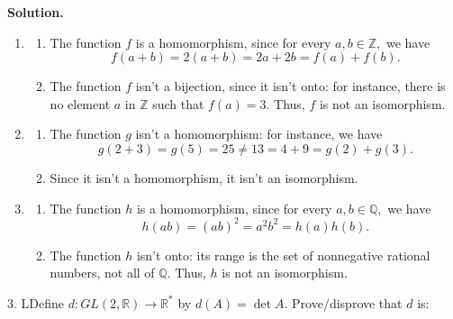 \documentclass[10pt,]{book}
\theoremstyle{plain}
\theoremstyle{definition}
\theoremstyle{definition}
\theoremstyle{definition}
\theoremstyle{definition}
\numberwithin{equation}{section}
\def\Z{\mathbb{Z}}
\def\R{\mathbb{R}}
\def\Q{\mathbb{Q}}
\begin{document}
\begin{exerciselist}
\begin{enumerate}[label=(\alph*)]
\end{enumerate}
%
\par\smallskip
\par\smallskip
\noindent\textbf{Solution.}\hypertarget{solution-22}{}\quad
\leavevmode%
\begin{enumerate}[label=(\alph*)]
\item\hypertarget{li-169}{}%
\begin{enumerate}[label=\roman*.]
\item\hypertarget{li-170}{}The function \(f\) is a homomorphism, since for every \(a,b \in
\Z,\) we have%
\begin{equation*}
f(a+b)=2(a+b)=2a+2b=f(a)+f(b).
\end{equation*}
%
\item\hypertarget{li-171}{}The function \(f\) isn't a bijection, since it isn't onto: for instance, there is no element \(a\) in \(\Z\) such that \(f(a)=3\). Thus, \(f\) is not an isomorphism.%
\end{enumerate}
%
\item\hypertarget{li-172}{}%
\begin{enumerate}[label=\roman*.]
\item\hypertarget{li-173}{}The function \(g\) isn't a homomorphism: for instance, we have%
\begin{equation*}
g(2+3)=g(5)=25\neq 13=4+9=g(2)+g(3).
\end{equation*}
%
\item\hypertarget{li-174}{}Since it isn't a homomorphism, it isn't an isomorphism.%
\end{enumerate}
%
\item\hypertarget{li-175}{}%
\begin{enumerate}[label=\roman*.]
\item\hypertarget{li-176}{}The function \(h\) is a homomorphism, since for every \(a,b \in
\Q,\) we have%
\begin{equation*}
h(ab)=(ab)^2=a^2b^2=h(a)h(b).
\end{equation*}
%
\item\hypertarget{li-177}{}The function \(h\) isn't onto: its range is the set of nonnegative rational numbers, not all of \(\Q\). Thus, \(h\) is not an isomorphism.%
\end{enumerate}
%
\end{enumerate}
%
\item[3.]\hypertarget{exercise-23}{}LDefine \(d : GL(2,\R)\to \R^*\) by \(d(A)=\det A\). Prove/disprove that \(d\) is: \leavevmode%
\begin{enumerate}[label=(\alph*)]

\end{enumerate}
\end{exerciselist}
\end{document}
